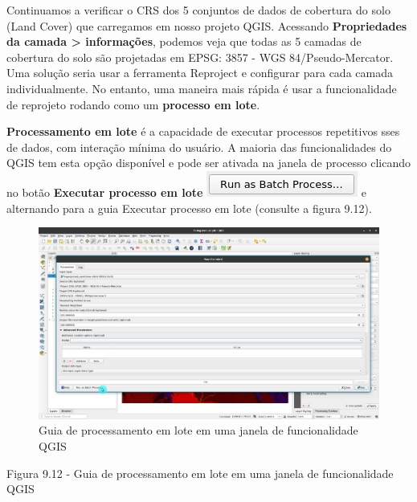 \documentclass[
  portuguese,
]{krantz}
\begin{document}
Continuamos a verificar o CRS dos 5 conjuntos de dados de cobertura do solo (Land Cover) que carregamos em nosso projeto QGIS. Acessando \textbf{Propriedades da camada \textgreater{} informações}, podemos veja que todas as 5 camadas de cobertura do solo são projetadas em EPSG: 3857 - WGS 84/Pseudo-Mercator. Uma solução seria usar a ferramenta Reproject e configurar para cada camada individualmente. No entanto, uma maneira mais rápida é usar a funcionalidade de reprojeto rodando como um \textbf{processo em lote}.

\textbf{Processamento em lote} é a capacidade de executar processos repetitivos sses de dados, com interação mínima do usuário. A maioria das funcionalidades do QGIS tem esta opção disponível e pode ser ativada na janela de processo clicando no botão \textbf{Executar processo em lote} \includegraphics{media/modulo9/batch-btn.png} e alternando para a guia Executar processo em lote (consulte a figura 9.12).

\begin{figure}
\centering
\includegraphics{media/modulo9/fig912.png}
\caption{Guia de processamento em lote em uma janela de funcionalidade QGIS}
\end{figure}

Figura 9.12 - Guia de processamento em lote em uma janela de funcionalidade QGIS
\end{document}
